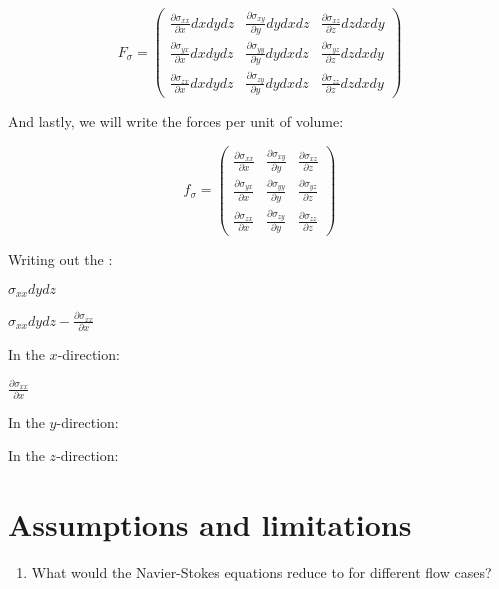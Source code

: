 \begin{equation}
F_{\sigma} = \left(
\begin{matrix} 
\frac{\partial \sigma_{xx}}{\partial x}dx dy dz & \frac{\partial \sigma_{xy}}{\partial y}dy dx dz & \frac{\partial \sigma_{xz}}{\partial z}dz dx dy \\
\frac{\partial \sigma_{yx}}{\partial x}dx dy dz & \frac{\partial \sigma_{yy}}{\partial y}dy dx dz & \frac{\partial \sigma_{yz}}{\partial z}dz dx dy\\
\frac{\partial \sigma_{zx}}{\partial x}dx dy dz & \frac{\partial \sigma_{zy}}{\partial y}dy dx dz & \frac{\partial \sigma_{zz}}{\partial z}dz dx dy
\end{matrix}
\right)
\end{equation}

And lastly, we will write the forces per unit of volume:

\begin{equation}
f_{\sigma} = \left(
\begin{matrix} 
\frac{\partial \sigma_{xx}}{\partial x} & \frac{\partial \sigma_{xy}}{\partial y} & \frac{\partial \sigma_{xz}}{\partial z} \\
\frac{\partial \sigma_{yx}}{\partial x} & \frac{\partial \sigma_{yy}}{\partial y} & \frac{\partial \sigma_{yz}}{\partial z} \\
\frac{\partial \sigma_{zx}}{\partial x} & \frac{\partial \sigma_{zy}}{\partial y} & \frac{\partial \sigma_{zz}}{\partial z}
\end{matrix}
\right)
\end{equation}

Writing out the :

$\sigma_{xx} dy dz$


$\sigma_{xx} dy dz - \frac{\partial \sigma_{xx}}{\partial x}$ 



In the $x$-direction: 

$\frac{\partial \sigma_{xx}}{\partial x}$ 

In the $y$-direction: 



In the $z$-direction: 









\section{Assumptions and limitations}






\begin{enumerate}

\item What would the Navier-Stokes equations reduce to for different flow cases?

\end{enumerate}

